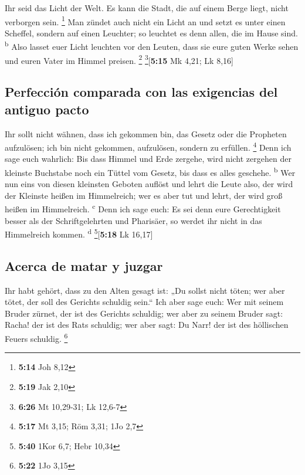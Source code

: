  Ihr seid das Licht der Welt. Es kann die Stadt, die auf
einem Berge liegt, nicht verborgen sein. \footnote{\textbf{5:14} Joh
  8,12}  Man zündet auch nicht ein Licht an und setzt es
unter einen Scheffel, sondern auf einen Leuchter; so leuchtet es denn
allen, die im Hause sind. \textsuperscript{b}  Also
lasset euer Licht leuchten vor den Leuten, dass sie eure guten Werke
sehen und euren Vater im Himmel preisen. \footnote{\textbf{5:19} Jak
  2,10} \footnote{\textbf{6:26} Mt 10,29-31; Lk 12,6-7}{[}\textbf{5:15}
Mk 4,21; Lk 8,16{]}

\hypertarget{perfecciuxf3n-comparada-con-las-exigencias-del-antiguo-pacto}{%
\subsection{Perfección comparada con las exigencias del antiguo
pacto}\label{perfecciuxf3n-comparada-con-las-exigencias-del-antiguo-pacto}}

 Ihr sollt nicht wähnen, dass ich gekommen bin, das
Gesetz oder die Propheten aufzulösen; ich bin nicht gekommen,
aufzulösen, sondern zu erfüllen. \footnote{\textbf{5:17} Mt 3,15; Röm
  3,31; 1Jo 2,7}  Denn ich sage euch wahrlich: Bis dass
Himmel und Erde zergehe, wird nicht zergehen der kleinste Buchstabe noch
ein Tüttel vom Gesetz, bis dass es alles geschehe. \textsuperscript{b}
 Wer nun eins von diesen kleinsten Geboten auflöst und
lehrt die Leute also, der wird der Kleinste heißen im Himmelreich; wer
es aber tut und lehrt, der wird groß heißen im Himmelreich.
\textsuperscript{c}  Denn ich sage euch: Es sei denn eure
Gerechtigkeit besser als der Schriftgelehrten und Pharisäer, so werdet
ihr nicht in das Himmelreich kommen. \textsuperscript{d}
\footnote{\textbf{5:40} 1Kor 6,7; Hebr 10,34}{[}\textbf{5:18} Lk
16,17{]}

\hypertarget{acerca-de-matar-y-juzgar}{%
\subsection{Acerca de matar y juzgar}\label{acerca-de-matar-y-juzgar}}

 Ihr habt gehört, dass zu den Alten gesagt ist: „Du
sollst nicht töten; wer aber tötet, der soll des Gerichts schuldig
sein.``  Ich aber sage euch: Wer mit seinem Bruder
zürnet, der ist des Gerichts schuldig; wer aber zu seinem Bruder sagt:
Racha! der ist des Rats schuldig; wer aber sagt: Du Narr! der ist des
höllischen Feuers schuldig. \footnote{\textbf{5:22} 1Jo 3,15}

